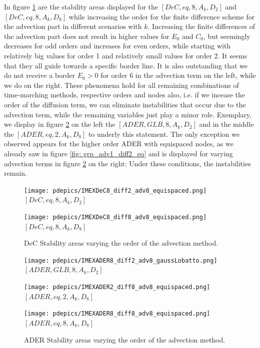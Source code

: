 In figure \ref{fig: exa_advtermDeC} are the stability areas displayed for the $[DeC,eq,8, A_k,D_2]$ and $[DeC,eq,8, A_k,D_8]$ while increasing the order for the finite difference scheme for the advection part in different scenarios with $k$. Increasing the finite differences of the advection part does not result in higher values for $E_0$ and $C_0$, but seemingly decreases for odd orders and increases for even orders, while starting with relatively big values for order 1 and relatively small values for order 2. It seems that they all guide towards a specific border line. It is also outstanding that  we do not receive a border $E_0>0$ for order 6 in the advection term on the left, while we do on the right. These phenomena hold for all remaining combinations of time-marching methods, respective orders and nodes also, i.e. if we incease the order of the diffusion term, we can eliminate instabilities that occur due to the advection term, while the remaining variables just play a minor role. Exemplary, we display in figure \ref{fig: exa_advtermADER} on the left the $[ADER,GLB,8, A_k,D_2]$ and in the middle the $[ADER,eq,2, A_k,D_8]$ to underly this statement. The only exception we observed appears for the higher order ADER with equispaced nodes, as we already saw in figure \ref{fig: grp_adv1_diff2_eq} and is displayed for varying advection terms in figure \ref{fig: exa_advtermADER} on the right: Under these conditions, the instabilities remain.

\begin{figure}[!h]
	\centering
	\begin{minipage}[t]{0.33\textwidth}
		\texttt{[image: pdepics/IMEXDeC8\_diff2\_adv8\_equispaced.png]}
		\centering
		$[DeC,eq,8, A_k,D_2]$
	\end{minipage} 
	\begin{minipage}[t]{0.33\textwidth}
		\texttt{[image: pdepics/IMEXDeC8\_diff8\_adv8\_equispaced.png]}
		\centering
		$[DeC,eq,8, A_k,D_8]$
	\end{minipage}
	\caption{DeC Stability areas varying the order of the advection method.}
	\label{fig: exa_advtermDeC}
\end{figure}


\begin{figure}[!h]
	\centering
	\begin{minipage}[t]{0.32\textwidth}
		\texttt{[image: pdepics/IMEXADER8\_diff2\_adv8\_gaussLobatto.png]}
		\centering
		$[ADER,GLB,8, A_k,D_2]$
	\end{minipage} 
	\begin{minipage}[t]{0.32\textwidth}
		\texttt{[image: pdepics/IMEXADER2\_diff8\_adv8\_equispaced.png]}
		\centering
		$[ADER,eq,2, A_k,D_8]$
	\end{minipage}
	\begin{minipage}[t]{0.32\textwidth}
		\texttt{[image: pdepics/IMEXADER8\_diff8\_adv8\_equispaced.png]}
		\centering
		$[ADER,eq,8, A_k,D_8]$
	\end{minipage}
	\caption{ADER Stability areas varying the order of the advection method.}
	\label{fig: exa_advtermADER}
\end{figure}

